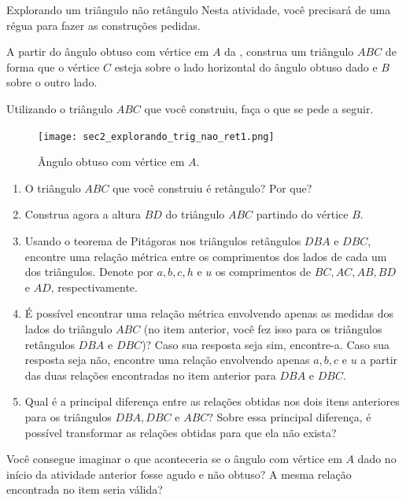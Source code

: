 \begin{task}{Explorando um triângulo não retângulo}
Nesta atividade, você precisará de uma régua para fazer as construções pedidas.

A partir do ângulo obtuso com vértice em $A$ da , construa um triângulo $ABC$ de forma que o vértice $C$ esteja sobre o lado horizontal do ângulo obtuso dado e $B$ sobre o outro lado. 

Utilizando o triângulo $ABC$ que você construiu, faça o que se pede a seguir.
\begin{figure}[H]
    \centering
    \texttt{[image: sec2\_explorando\_trig\_nao\_ret1.png]}
    \caption{Ângulo obtuso com vértice em $A$.}
    \label{sec2_explorando_trig_nao_ret_fig}
\end{figure}

\begin{enumerate}
    \item{}
    O triângulo $ABC$ que você construiu é retângulo? Por que?
    
    \item{}
    Construa agora a altura $BD$ do triângulo $ABC$ partindo do vértice $B$. 
    
    \item{}
    Usando o teorema de Pitágoras nos triângulos retângulos $DBA$ e $DBC$, encontre uma relação métrica entre os comprimentos dos lados de cada um dos triângulos. Denote por $a, b, c, h$ e $u$ os comprimentos de $BC, AC, AB, BD$ e $AD$, respectivamente. 
    
    \item{}
    É possível encontrar uma relação métrica envolvendo apenas as medidas dos lados do triângulo $ABC$ (no item anterior, você fez isso para os triângulos retângulos $DBA$ e $DBC$)? Caso sua resposta seja sim, encontre-a. Caso sua resposta seja não, encontre uma relação envolvendo apenas $a, b, c$ e $u$ a partir das duas relações encontradas no item anterior para $DBA$ e $DBC$.
    
    \item{}
    Qual é a principal diferença entre as relações obtidas nos dois itens anteriores para os triângulos $DBA, DBC$ e $ABC$? Sobre essa principal diferença, é possível transformar as relações obtidas para que ela não exista?
    
    \end{enumerate}
\end{task}

\begin{reflection}
Você consegue imaginar o que aconteceria se o ângulo com vértice em $A$ dado no início da atividade anterior fosse agudo e não obtuso? A mesma relação encontrada no item  seria válida?
\end{reflection}

